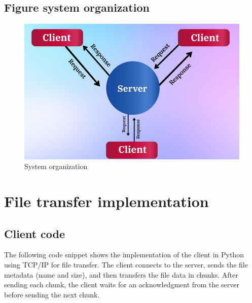 \documentclass{article}
\begin{document}
\thispagestyle{empty}
    \newpage

\subsection{Figure system organization}
\begin{figure}[ht!]
    \centering
    \includegraphics[width=1\textwidth]{Figure/System-architecture.png}
    \caption{System organization}
    \label{fig:system_organ}
\end{figure}

\section{File transfer implementation}

\subsection{Client code}
The following code snippet shows the implementation of the client in Python using TCP/IP for file transfer. The client connects to the server, sends the file metadata (name and size), and then transfers the file data in chunks. After sending each chunk, the client waits for an acknowledgment from the server before sending the next chunk.

\thispagestyle{empty}
    \newpage
    
\end{document}
